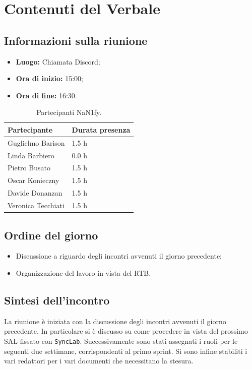 \documentclass[8pt]{article}
\begin{document}
\section{Contenuti del Verbale}
\subsection{Informazioni sulla riunione}
\begin{itemize}
	\setlength\itemsep{0em}
	\item\textbf{Luogo:} Chiamata Discord;
	\item\textbf{Ora di inizio:} 15:00;
	\item\textbf{Ora di fine:}  16:30.
\end{itemize}
\begin{table}[ht!]
	\begin{minipage}[t]{0.5\linewidth}
		\centering
		\begin{tabular}{p{3cm} p{3cm}}
			\toprule
			\textbf{Partecipante} & \textbf{Durata presenza} \\
			\midrule
			Guglielmo Barison & 1.5 h \\
			Linda Barbiero &  0.0 h \\
			Pietro Busato & 1.5 h \\
			Oscar Konieczny & 1.5 h \\
			Davide Donanzan & 1.5 h \\
			Veronica Tecchiati & 1.5 h \\
			\bottomrule
		\end{tabular}
		\caption{Partecipanti NaN1fy.}
		\label{table:Partecipanti NaN1fy}
	\end{minipage}
\end{table}
\subsection{Ordine del giorno}
\begin{itemize}
	\setlength\itemsep{0em}
	\item Discussione a riguardo degli incontri avvenuti il giorno precedente;
	\item Organizzazione del lavoro in vista del RTB.
\end{itemize}
\subsection{Sintesi dell'incontro}
La riunione è iniziata con la discussione degli incontri avvenuti il giorno precedente. In particolare si è discusso su come procedere in vista del prossimo SAL fissato con \texttt{SyncLab}. Successivamente sono stati assegnati i ruoli per le seguenti due settimane, corrispondenti al primo sprint. Si sono infine stabiliti i vari redattori per i vari documenti che necessitano la stesura.
\end{document}
